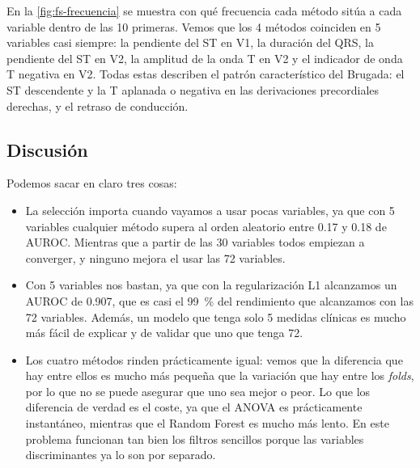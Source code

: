 En la \cref{fig:fs-frecuencia} se muestra con qué frecuencia cada método sitúa a cada variable dentro de las 10 primeras. Vemos que los 4 métodos coinciden en 5 variables casi siempre: la pendiente del ST en V1, la duración del QRS, la pendiente del ST en V2, la amplitud de la onda T en V2 y el indicador de onda T negativa en V2. Todas estas describen el patrón característico del Brugada: el ST descendente y la T aplanada o negativa en las derivaciones precordiales derechas, y el retraso de conducción.


\subsection{Discusión}

Podemos sacar en claro tres cosas:

\begin{itemize}
  \item La selección importa cuando vayamos a usar pocas variables, ya que con 5 variables cualquier método supera al orden aleatorio entre \num{0.17} y \num{0.18} de AUROC. Mientras que a partir de las 30 variables todos empiezan a converger, y ninguno mejora el usar las 72 variables.
  \item Con 5 variables nos bastan, ya que con la regularización L1 alcanzamos un AUROC de \num{0.907}, que es casi el \SI{99}{\percent} del rendimiento que alcanzamos con las 72 variables. Además, un modelo que tenga solo 5 medidas clínicas es mucho más fácil de explicar y de validar que uno que tenga 72.
  \item Los cuatro métodos rinden prácticamente igual: vemos que la diferencia que hay entre ellos es mucho más pequeña que la variación que hay entre los \emph{folds}, por lo que no se puede asegurar que uno sea mejor o peor. Lo que los diferencia de verdad es el coste, ya que el ANOVA es prácticamente instantáneo, mientras que el Random Forest es mucho más lento. En este problema funcionan tan bien los filtros sencillos porque las variables discriminantes ya lo son por separado.
\end{itemize}
